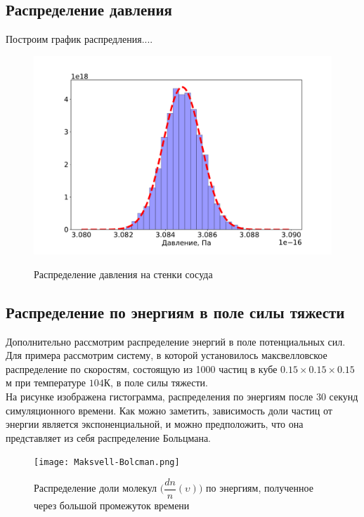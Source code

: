 \documentclass[twoside,twocolumn, 11pt]{article}
\theoremstyle{plain}
\theoremstyle{definition}
\begin{document}
\subsection{Распределение давления}
Построим график распредления....
\begin{figure}[h!]
{\includegraphics[width=1\linewidth]{hist_p}}
\caption{Распределение давления на стенки сосуда}
\end{figure}

\subsection{Распределение по энергиям в поле силы тяжести}

Дополнительно рассмотрим распределение энергий в поле потенциальных сил. Для примера рассмотрим систему, в которой установилось максвелловское распределение по скоростям, состоящую из 1000 частиц в кубе $0.15 \times 0.15 \times 0.15$м при температуре $104$К, в поле силы тяжести.\\
\indent На рисунке изображена гистограмма, распределения по энергиям после 30 секунд симуляционного времени. Как можно заметить, зависимость доли частиц от энергии является экспоненциальной, и можно предположить, что она представляет из себя распределение Больцмана.

\begin{figure}[!h]
{\texttt{[image: Maksvell-Bolcman.png]}}
\caption{Распределение доли молекул $\Big(\dfrac{dn}{n} (\upsilon) \Big)$ по энергиям, полученное через большой промежуток времени}
\end{figure}
\end{document}
